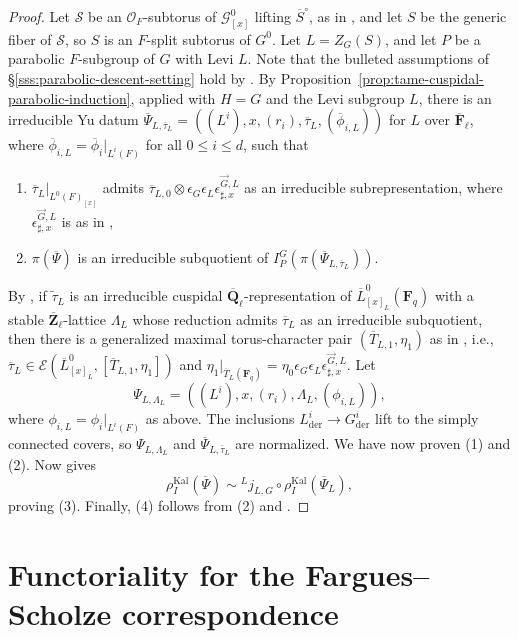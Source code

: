 \documentclass[reqno]{amsart}
\numberwithin{equation}{subsection}
\newcommand{\F}{\mathbf{F}}
\newcommand{\wt}[1]{\widetilde{#1}}
\newcommand{\Q}{\mathbf{Q}}
\newcommand{\Z}{\mathbf{Z}}
\newcommand{\cal}[1]{\mathcal{#1}}
\newcommand{\ol}[1]{\overline{#1}}
\newcommand{\ld}{{}^L}
\newcommand\cE{\mathcal{E}}
\newcommand\cO{\mathcal{O}}
\DeclareMathOperator{\Kal}{Kal}
\DeclareMathOperator{\der}{der}
\theoremstyle{remark}
\numberwithin{equation}{subsection}
\numberwithin{figure}{subsection}
\begin{document}
\begin{proof}
Let $\cal S$ be an $\cO_F$-subtorus of $\cal G^0_{[x]}$ lifting $\ol S^\circ$, as in \cite[\S 7.2]{CF26a}, and let $S$ be the generic fiber of $\cal S$, so $S$ is an $F$-split subtorus of $G^0$. Let $L = Z_G(S)$, and let $P$ be a parabolic $F$-subgroup of $G$ with Levi $L$. Note that the bulleted assumptions of \S\ref{sss:parabolic-descent-setting} hold by \cite[Lemmas~9.1.2 and 9.1.1]{CF26a}. By Proposition~\ref{prop:tame-cuspidal-parabolic-induction}, applied with $H = G$ and the Levi subgroup $L$, there is an irreducible Yu datum $\ol\Psi_{L,\ol\tau_L} = ((L^i),x,(r_i),\ol\tau_L,(\ol\phi_{i,L}))$ for $L$ over $\ol\F_\ell$, where $\ol\phi_{i,L} = \ol\phi_i|_{L^i(F)}$ for all $0\leq i\leq d$, such that
\begin{enumerate}[label=(\Alph*)]
\item $\ol\tau_L|_{L^0(F)_{[x]}}$ admits $\ol\tau_{L,0} \otimes \epsilon_G\epsilon_L\epsilon_{\sharp,x}^{\vec G, L}$ as an irreducible subrepresentation, where $\epsilon_{\sharp, x}^{\vec G, L}$ is as in \cite[(3.3.4)]{CF26a},
\item $\pi(\ol\Psi)$ is an irreducible subquotient of $I_P^G(\pi(\ol\Psi_{L,\ol\tau_L}))$.
\end{enumerate} 
By \cite[Lemma~2.10.3]{Cot26b}, if $\wt\tau_L$ is an irreducible cuspidal $\ol\Q_\ell$-representation of $\ol L^0_{[x]_L}(\F_q)$ with a stable $\ol\Z_\ell$-lattice $\Lambda_L$ whose reduction admits $\ol\tau_L$ as an irreducible subquotient, then there is a generalized maximal torus-character pair $(\ol T_{L,1},\eta_1)$ as in \cite[(9.2.3)--(9.2.4)]{CF26a}, i.e., $\ol\tau_L\in\cE(\ol L^0_{[x]_L},[\ol T_{L,1},\eta_1])$ and $\eta_1|_{\ol T_L(\F_q)}  = \eta_0\epsilon_G\epsilon_L\epsilon_{\sharp,x}^{\vec G, L}$. Let
\[
\Psi_{L,\Lambda_L} = ((L^i),x,(r_i),\Lambda_L,(\phi_{i,L})),
\]
where $\phi_{i,L} = \phi_i|_{L^i(F)}$ as above. The inclusions $L^i_{\der}\to G^i_{\der}$ lift to the simply connected covers, so $\Psi_{L,\Lambda_L}$ and $\ol\Psi_{L,\ol\tau_L}$ are normalized. We have now proven (1) and (2). Now \cite[Theorem~9.3.3]{CF26a} gives
\[
\rho_I^{\Kal}(\ol\Psi) \sim \ld j_{L,G} \circ \rho_I^{\Kal}(\ol\Psi_L),
\]
proving (3). Finally, (4) follows from (2) and \cite[Theorem I.9.6(viii)]{FS}.
\end{proof}







\section{Functoriality for the Fargues--Scholze correspondence}\label{section:fs-functoriality}
\end{document}
